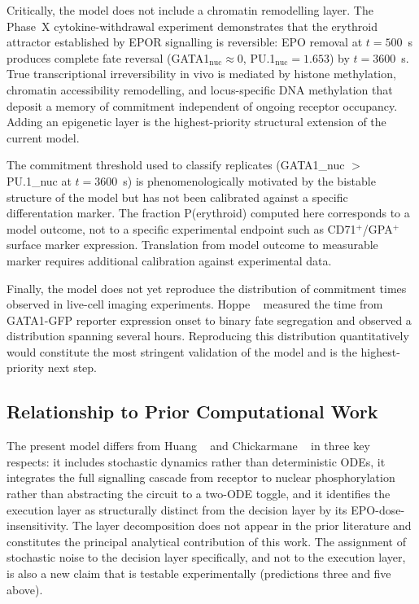Critically, the model does not include a chromatin remodelling layer. The Phase~X cytokine-withdrawal experiment demonstrates that the erythroid attractor established by EPOR signalling is reversible: EPO removal at $t=500$~s produces complete fate reversal (GATA1$_\text{nuc}\approx 0$, PU.1$_\text{nuc}=1.653$) by $t=3600$~s. True transcriptional irreversibility in vivo is mediated by histone methylation, chromatin accessibility remodelling, and locus-specific DNA methylation that deposit a memory of commitment independent of ongoing receptor occupancy. Adding an epigenetic layer is the highest-priority structural extension of the current model.

The commitment threshold used to classify replicates (GATA1\_nuc $>$ PU.1\_nuc at $t = 3600$~s) is phenomenologically motivated by the bistable structure of the model but has not been calibrated against a specific differentation marker. The fraction P(erythroid) computed here corresponds to a model outcome, not to a specific experimental endpoint such as CD71$^+$/GPA$^+$ surface marker expression. Translation from model outcome to measurable marker requires additional calibration against experimental data.

Finally, the model does not yet reproduce the distribution of commitment times observed in live-cell imaging experiments. Hoppe \etal~\cite{hoppe2016} measured the time from GATA1-GFP reporter expression onset to binary fate segregation and observed a distribution spanning several hours. Reproducing this distribution quantitatively would constitute the most stringent validation of the model and is the highest-priority next step.

\subsection{Relationship to Prior Computational Work}

The present model differs from Huang \etal~\cite{huang2007} and Chickarmane \etal~\cite{chickarmane2009} in three key respects: it includes stochastic dynamics rather than deterministic ODEs, it integrates the full signalling cascade from receptor to nuclear phosphorylation rather than abstracting the circuit to a two-ODE toggle, and it identifies the execution layer as structurally distinct from the decision layer by its EPO-dose-insensitivity. The layer decomposition does not appear in the prior literature and constitutes the principal analytical contribution of this work. The assignment of stochastic noise to the decision layer specifically, and not to the execution layer, is also a new claim that is testable experimentally (predictions three and five above).
